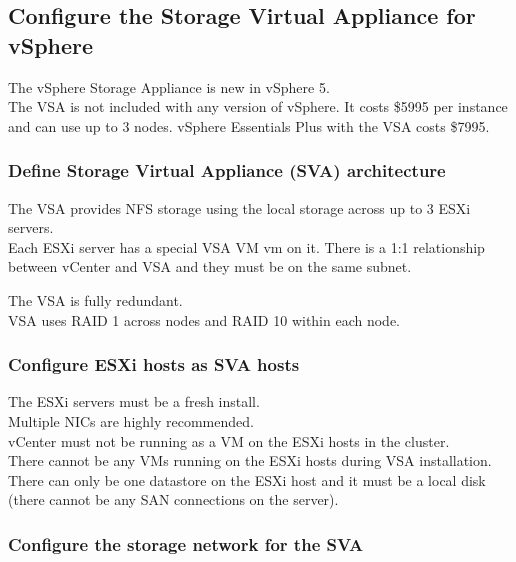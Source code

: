 \subsection{Configure the Storage Virtual Appliance for vSphere}

The vSphere Storage Appliance is new in vSphere 5.\\

The VSA is not included with any version of vSphere. It costs \$5995 per
instance and can use up to 3 nodes. vSphere Essentials Plus with the VSA
costs \$7995.

\subsubsection{Define Storage Virtual Appliance (SVA) architecture}

The VSA provides NFS storage using the local storage across up to 3 ESXi
servers.\\

Each ESXi server has a special VSA VM vm on it. There is a 1:1 relationship
between vCenter and VSA and they must be on the same subnet.

The VSA is fully redundant.\\

VSA uses RAID 1 across nodes and RAID 10 within each node.\\

\subsubsection{Configure ESXi hosts as SVA hosts}

The ESXi servers must be a fresh install.\\

Multiple NICs are highly recommended.\\

vCenter must not be running as a VM on the ESXi hosts in the cluster.\\

There cannot be any VMs running on the ESXi hosts during VSA installation.\\

There can only be one datastore on the ESXi host and it must be a local disk
(there cannot be any SAN connections on the server).

\subsubsection{Configure the storage network for the SVA}

